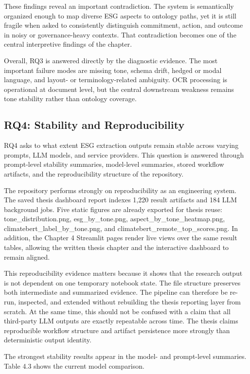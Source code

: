 These findings reveal an important contradiction. The system is semantically organized enough to map diverse ESG aspects to ontology paths, yet it is still fragile when asked to consistently distinguish commitment, action, and outcome in noisy or governance-heavy contexts. That contradiction becomes one of the central interpretive findings of the chapter.

Overall, RQ3 is answered directly by the diagnostic evidence. The most important failure modes are missing tone, schema drift, hedged or modal language, and layout- or terminology-related ambiguity. OCR processing is operational at document level, but the central downstream weakness remains tone stability rather than ontology coverage.

\subsection{RQ4: Stability and Reproducibility}

RQ4 asks to what extent ESG extraction outputs remain stable across varying prompts, LLM models, and service providers. This question is answered through prompt-level stability summaries, model-level summaries, stored workflow artifacts, and the reproducibility structure of the repository.

The repository performs strongly on reproducibility as an engineering system. The saved thesis dashboard report indexes 1,220 result artifacts and 184 LLM background jobs. Five static figures are already exported for thesis reuse: tone\_distribution.png, esg\_by\_tone.png, aspect\_by\_tone\_heatmap.png, climatebert\_label\_by\_tone.png, and climatebert\_remote\_top\_scores.png. In addition, the Chapter 4 Streamlit pages render live views over the same result tables, allowing the written thesis chapter and the interactive dashboard to remain aligned.

This reproducibility evidence matters because it shows that the research output is not dependent on one temporary notebook state. The file structure preserves both intermediate and summarized evidence. The pipeline can therefore be re-run, inspected, and extended without rebuilding the thesis reporting layer from scratch. At the same time, this should not be confused with a claim that all third-party LLM outputs are exactly repeatable across time. The thesis claims reproducible workflow structure and artifact persistence more strongly than deterministic output identity.

The strongest stability results appear in the model- and prompt-level summaries. Table 4.3 shows the current model comparison.


